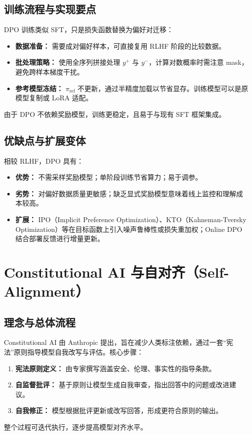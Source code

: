\documentclass[UTF8,zihao=-4]{ctexart}
\begin{document}
\subsection{训练流程与实现要点}
DPO 训练类似 SFT，只是损失函数替换为偏好对迁移：
\begin{itemize}
  \item \textbf{数据准备：} 需要成对偏好样本，可直接复用 RLHF 阶段的比较数据。
  \item \textbf{批处理策略：} 使用全序列拼接处理 $y^+$ 与 $y^-$，计算对数概率时需注意 mask，避免跨样本梯度干扰。
  \item \textbf{参考模型冻结：} $\pi_{\text{ref}}$ 不更新，通过半精度加载以节省显存。训练模型可以是原模型复制或 LoRA 适配。
\end{itemize}
由于 DPO 不依赖奖励模型，训练更稳定，且易于与现有 SFT 框架集成。

\subsection{优缺点与扩展变体}
相较 RLHF，DPO 具有：
\begin{itemize}
  \item \textbf{优势：} 不需采样奖励模型；单阶段训练节省算力；易于调参。
  \item \textbf{劣势：} 对偏好数据质量更敏感；缺乏显式奖励模型意味着线上监控和理解成本较高。
  \item \textbf{扩展：} IPO（Implicit Preference Optimization）、KTO（Kahneman-Tversky Optimization）等在目标函数上引入噪声鲁棒性或损失重加权；Online DPO 结合部署反馈进行增量更新。
\end{itemize}

\section{Constitutional AI 与自对齐（Self-Alignment）}
\subsection{理念与总体流程}
Constitutional AI 由 Anthropic 提出，旨在减少人类标注依赖，通过一套“宪法”原则指导模型自我改写与评估。核心步骤：
\begin{enumerate}
  \item \textbf{宪法原则定义：} 由专家撰写涵盖安全、伦理、事实性的指导条款。
  \item \textbf{自监督批评：} 基于原则让模型生成自我审查，指出回答中的问题或改进建议。
  \item \textbf{自我修正：} 模型根据批评更新或改写回答，形成更符合原则的输出。
\end{enumerate}
整个过程可迭代执行，逐步提高模型对齐水平。
\end{document}
